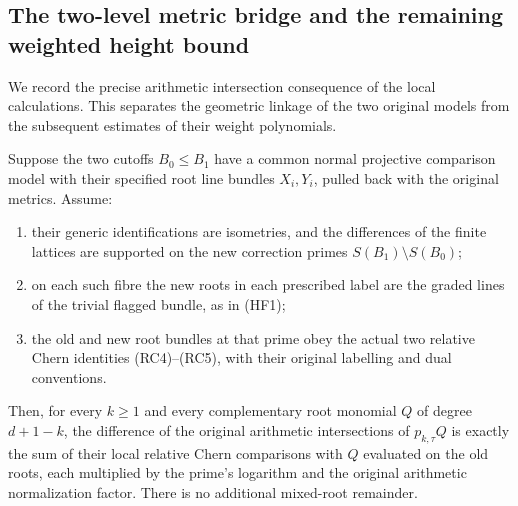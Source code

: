 \subsection{The two-level metric bridge and the remaining weighted height bound}
\label{sec:geometry-two-level-weighted-bridge}

We record the precise arithmetic intersection consequence of the local
calculations. This separates the geometric linkage of the two original
models from the subsequent estimates of their weight polynomials.

\begin{lemma}
\label{lem:geometry-two-level-vertical-bridge}
Suppose the two cutoffs \(B_0\le B_1\) have a common normal
projective comparison model with their specified root line bundles
\(X_i,Y_i\), pulled back with the original metrics. Assume:
\begin{enumerate}
\item their generic identifications are isometries, and the
  differences of the finite lattices are supported on the new
  correction primes \(S(B_1)\setminus S(B_0)\);
\item on each such fibre the new roots in each prescribed label
  are the graded lines of the trivial flagged bundle, as in (HF1);
\item the old and new root bundles at that prime obey the actual
  two relative Chern identities (RC4)--(RC5), with their
  original labelling and dual conventions.
\end{enumerate}
Then, for every \(k\ge1\) and every complementary root monomial
\(Q\) of degree \(d+1-k\), the difference of the original arithmetic
intersections of \(p_{k,\tau}Q\) is exactly the sum of their local
relative Chern comparisons with \(Q\) evaluated on the old roots,
each multiplied by the prime's logarithm and the original
arithmetic normalization factor. There is no additional
mixed-root remainder.
\end{lemma}
